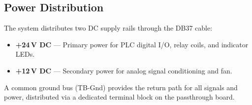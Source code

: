 \documentclass[main.tex]{subfiles}
\begin{document}
\subsection{Power Distribution}

The system distributes two DC supply rails through the DB37 cable:
\begin{itemize}
    \item \textbf{+24\,V DC} --- Primary power for PLC digital I/O, relay coils, and indicator LEDs.
    \item \textbf{+12\,V DC} --- Secondary power for analog signal conditioning and fan.
\end{itemize}
A common ground bus (TB-Gnd) provides the return path for all signals and power, distributed via a dedicated terminal block on the passthrough board.
\end{document}
